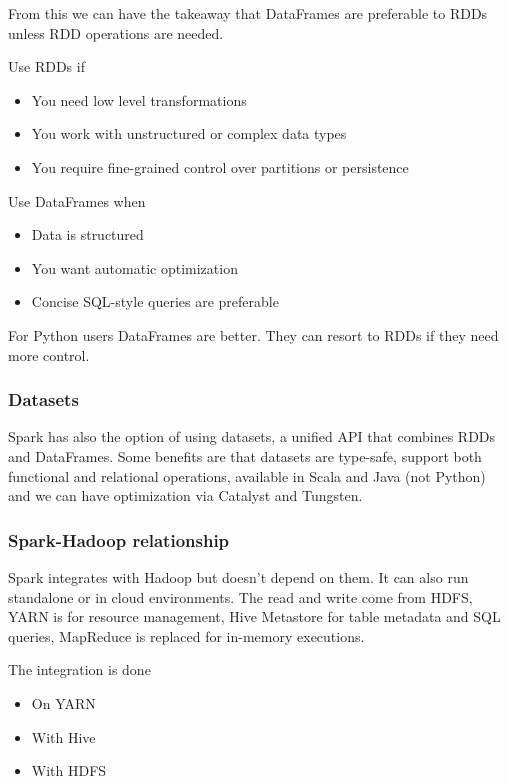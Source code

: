 From this we can have the takeaway that DataFrames are preferable to RDDs unless RDD operations are needed.

\vspace{10pt}

Use RDDs if
\begin{itemize}
    \item You need low level transformations
    \item You work with unstructured or complex data types
    \item You require fine-grained control over partitions or persistence
\end{itemize}

Use DataFrames when

\begin{itemize}
    \item Data is structured
    \item You want automatic optimization
    \item Concise SQL-style queries are preferable
\end{itemize}

For Python users DataFrames are better. They can resort to RDDs if they need more control.




\subsubsection{Datasets}

Spark has also the option of using datasets, a unified API that combines RDDs and DataFrames. Some benefits are that datasets are type-safe, support both functional and relational operations, available in Scala and Java (not Python) and we can have optimization via Catalyst and Tungsten.

\subsubsection{Spark-Hadoop relationship}


Spark integrates with Hadoop but doesn't depend on them. It can also run standalone or in cloud environments. The read and write come from HDFS, YARN is for resource management, Hive Metastore for table metadata and SQL queries, MapReduce is replaced for in-memory executions.

\vspace{10pt}

The integration is done
\begin{itemize}
    \item On YARN
    \item With Hive
    \item With HDFS
\end{itemize}


